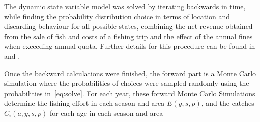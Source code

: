 \documentclass[12pt,oneline,a4paper,numbib]{ouparticle}
\numberwithin{equation}{subsection} %
\begin{document}
The dynamic state variable model was solved by iterating backwards in time, while finding the probability distribution choice in terms of location and discarding behaviour for all possible states, combining the net revenue obtained from the sale of fish and costs of a fishing trip and the effect of the annual fines when exceeding annual quota. Further details for this procedure can be found in \cite{Alzorriz2018, Batsleer2016} and \cite{Dowling2011}.

Once the backward calculations were finished, the forward part is a Monte Carlo simulation where the probabilities of choices were sampled randomly using the probabilities in~\ref{eq:solve}. For each year, these forward Monte Carlo Simulations determine the fishing effort in each season and area $E(y,s,p)$, and the catches $C_i (a, y, s, p)$ for each age in each season and area
\end{document}
